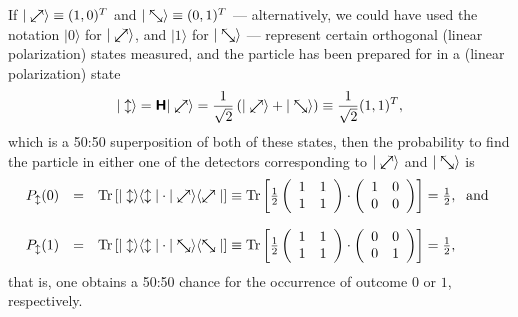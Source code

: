 \documentclass[%
 preprint,
 showpacs,
 showkeys,
 preprintnumbers,
 amsmath,amssymb,
 aps,
 prl,
  longbibliography,
 ]{revtex4-1}
\begin{document}
If
$\vert \swarrow\mkern-18mu\nearrow \rangle \equiv (1,0)^T$ and
$\vert \searrow\mkern-18mu\nwarrow \rangle \equiv (0,1)^T$
--- alternatively, we could have used the notation $\vert 0 \rangle$  for $\vert \swarrow\mkern-18mu\nearrow \rangle$,
and $\vert 1 \rangle$  for $\vert \searrow\mkern-18mu\nwarrow \rangle$ ---
represent
certain orthogonal (linear polarization) states measured,
and the particle has been prepared for in a (linear polarization) state
\begin{equation}
\vert \updownarrow \rangle  =
\textsf{\textbf{H}} \vert \swarrow\mkern-18mu\nearrow \rangle =
\frac{1}{\sqrt{2}} \left( \vert \swarrow\mkern-18mu\nearrow \rangle
  + \vert \searrow\mkern-18mu\nwarrow  \rangle \right) \equiv \frac{1}{\sqrt{2}} (1,1)^T,
\end{equation}
which is a 50:50 superposition of both of these states,
then the probability to find the particle in either one of the detectors corresponding to
$\vert \swarrow\mkern-18mu\nearrow \rangle $ and
$\vert \searrow\mkern-18mu\nwarrow  \rangle $ is
\begin{equation}
\begin{array}{rcl}
P_\updownarrow (0)
&=&
\textrm{Tr} \left[
\vert \updownarrow \rangle \langle  \updownarrow \vert \cdot \vert \swarrow\mkern-18mu\nearrow \rangle \langle  \swarrow\mkern-18mu\nearrow \vert
\right]
\equiv
\textrm{Tr}
\left[
\frac{1}{2}\left(
\begin{array}{cc}
1&1\\
1&1
\end{array}
\right)
\cdot
\left(
\begin{array}{cc}
1&0\\
0&0
\end{array}
\right)
\right]
=\frac{1}{2},\;\textrm{
and }\\[4ex]
P_\updownarrow (1)&=&
\textrm{Tr} \left[
\vert \updownarrow \rangle \langle  \updownarrow \vert \cdot \vert \searrow\mkern-18mu\nwarrow  \rangle \langle   \searrow\mkern-18mu\nwarrow \vert
\right]
\equiv
\textrm{Tr}
\left[
\frac{1}{2}\left(
\begin{array}{cc}
1&1\\
1&1
\end{array}
\right)
\cdot
\left(
\begin{array}{cc}
0&0\\
0&1
\end{array}
\right)
\right]
=\frac{1}{2},
\end{array}
\end{equation}
that is, one obtains  a 50:50 chance for the occurrence of outcome $0$ or $1$, respectively.
\end{document}
